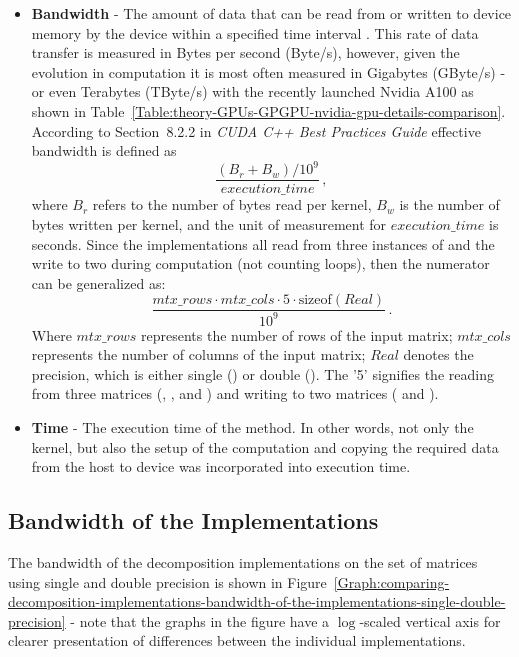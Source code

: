 \begin{itemize}
	\item \textbf{Bandwidth} - The amount of data that can be read from or written to device memory by the device within a specified time interval \cite{F4RUu4doMdeEMKXX}. This rate of data transfer is measured in Bytes per second (Byte/s), however, given the evolution in computation it is most often measured in Gigabytes (GByte/s) - or even Terabytes (TByte/s) with the recently launched Nvidia A100 as shown in Table~\ref{Table:theory-GPUs-GPGPU-nvidia-gpu-details-comparison}. According to Section~8.2.2 in \emph{CUDA C++ Best Practices Guide} \cite{F4RUu4doMdeEMKXX} effective bandwidth is defined as
		\begin{equation}
			\frac{\left(B_r + B_w\right)/10^9}{execution\_time} \nonumber\,,
		\end{equation}
	where $ B_r $ refers to the number of bytes read per kernel, $ B_w $ is the number of bytes written per kernel, and the unit of measurement for $ execution\_time $ is seconds. Since the implementations all read from three instances of  and the write to two during computation (not counting loops), then the numerator can be generalized as:
		\begin{equation}
			\frac{mtx\_rows \cdot mtx\_cols \cdot 5 \cdot \mathrm{sizeof} \left(Real\right)}{10^9} \nonumber\,.
		\end{equation}
	Where $ mtx\_rows $ represents the number of rows of the input matrix; $ mtx\_cols $ represents the number of columns of the input matrix; $ Real $ denotes the precision, which is either single () or double (). The '5' signifies the reading from three matrices (, , and ) and writing to two matrices ( and ).
	\item \textbf{Time} - The execution time of the  method. In other words, not only the kernel, but also the setup of the computation and copying the required data from the host to device was incorporated into execution time.
\end{itemize}

\subsection{Bandwidth of the Implementations \TO}\label{Subsection:comparing-decomposition-implementations-bandwidth-of-the-implementations}
The bandwidth of the decomposition implementations on the set of matrices using single and double precision is shown in Figure~\ref{Graph:comparing-decomposition-implementations-bandwidth-of-the-implementations-single-double-precision} - note that the graphs in the figure have a $ \log $-scaled vertical axis for clearer presentation of differences between the individual implementations.

